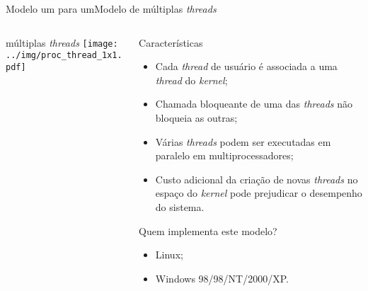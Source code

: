\begin{frame}{Modelo um para um}{Modelo de múltiplas {\em threads}}
  \begin{columns}
    \begin{column}{0.375\textwidth}
      \begin{block}{múltiplas \em threads}
        \texttt{[image: ../img/proc\_thread\_1x1.pdf]}
      \end{block}
    \end{column}
    \small
    \begin{column}{0.6\textwidth}
      \begin{block}{Características}
        \begin{itemize}
        \item Cada {\em thread} de usuário é associada a uma {\em
            thread} do {\em kernel};
        \item Chamada bloqueante de uma das {\em threads} \alert{não} bloqueia as outras;
        \item Várias {\em threads} podem ser executadas em paralelo em
          multiprocessadores;
        \item Custo adicional da criação de novas {\em threads} no
          espaço do {\em kernel} pode prejudicar o desempenho do sistema.
        \end{itemize}
      \end{block}
      \begin{block}{Quem implementa este modelo?}
        \begin{itemize}
        \item Linux;
        \item Windows 98/98/NT/2000/XP.
        \end{itemize}
      \end{block}
    \end{column}
  \end{columns}
\end{frame}

